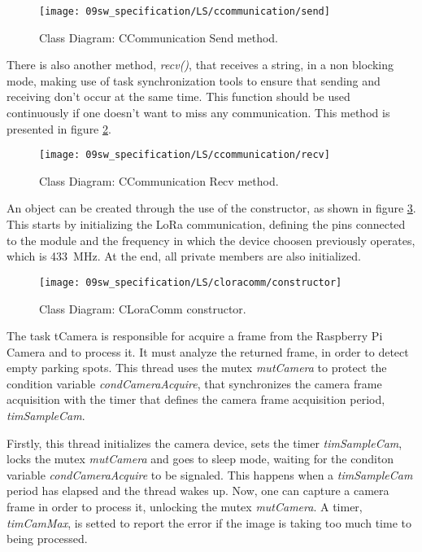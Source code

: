 \begin{figure}[H]
	\centering
	\texttt{[image: 09sw\_specification/LS/ccommunication/send]}
	\caption{Class Diagram: CCommunication Send method.}
	\label{fig:CCommunicationsend}
\end{figure}

There is also another method, \textit{recv()}, that receives a string, in a non blocking mode, making use of task synchronization tools to ensure that sending and receiving don't occur at the same time. This function should be used continuously if one doesn't want to miss any communication. This method is presented in figure \ref{fig:CCommunicationrecv}.

\begin{figure}[H]
	\centering
	\texttt{[image: 09sw\_specification/LS/ccommunication/recv]}
	\caption{Class Diagram: CCommunication Recv method.}
	\label{fig:CCommunicationrecv}
\end{figure}


An object can be created through the use of the constructor, as shown in figure \ref{fig:LoraComm}.
This starts by initializing the LoRa communication, defining the pins connected to the module and the frequency in which the device choosen previously operates, which is 433~MHz. At the end, all private members are also initialized.

\begin{figure}[H]
	\centering
	\texttt{[image: 09sw\_specification/LS/cloracomm/constructor]}
	\caption{Class Diagram: CLoraComm constructor.}
	\label{fig:LoraComm}
\end{figure}


The task tCamera is responsible for acquire a frame from the Raspberry Pi Camera and to process it. It must analyze the returned frame, in order to detect empty parking spots. This thread uses the mutex \textit{mutCamera} to protect the condition variable \textit{condCameraAcquire}, that synchronizes the camera frame acquisition with the timer that defines the camera frame acquisition period, \textit{timSampleCam}.

Firstly, this thread initializes the camera device, sets the timer \textit{timSampleCam}, locks the mutex \textit{mutCamera} and goes to sleep mode, waiting for the conditon variable \textit{condCameraAcquire} to be signaled. This happens when a \textit{timSampleCam} period has elapsed and the thread wakes up. Now, one can capture a camera frame in order to process it, unlocking the mutex \textit{mutCamera}. A timer, \textit{timCamMax}, is setted to report the error if the image is taking too much time to being processed.

